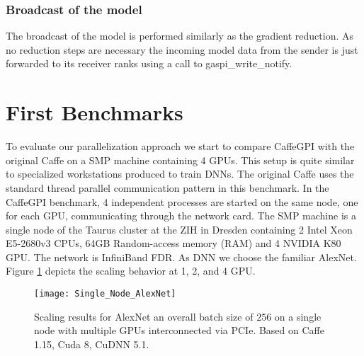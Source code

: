 \documentclass[twoside,twocolumn]{article}
\begin{document}
\subsubsection{Broadcast of the model}
The broadcast of the model is performed similarly as the gradient reduction.
As no reduction steps are necessary the incoming model data from the sender is
just forwarded to its receiver ranks using a call to gaspi\_write\_notify.




\section{First Benchmarks}
\label{s:benchmarks}


To evaluate our parallelization approach we start to compare CaffeGPI with
the original Caffe on a SMP machine containing 4 GPUs. This setup is quite
similar to specialized workstations produced to train DNNs.
The original Caffe
uses the standard thread parallel communication pattern in this benchmark.
In the CaffeGPI benchmark,
4 independent processes are started on the same node, one for each GPU,
communicating through the network card.
The SMP machine is a single
node of the Taurus cluster at the ZIH in Dresden containing 2 Intel\texttrademark
 Xeon E5-2680v3 CPUs, 64GB
Random-access memory (RAM) and
4 NVIDIA K80 GPU. 
The network is InfiniBand FDR. As DNN we choose the familiar AlexNet.
Figure \ref{fig:ResAlexSingle} depicts the scaling behavior at 1, 2, and 4 GPU.

\begin{figure}[htbp]
\centering%
\texttt{[image: Single\_Node\_AlexNet]}
\caption{Scaling results for AlexNet an overall  batch size of $256$ on a single node with multiple GPUs
interconnected via PCIe. Based on Caffe 1.15, Cuda 8, CuDNN 5.1.  }
\label{fig:ResAlexSingle}
\end{figure}
\end{document}
